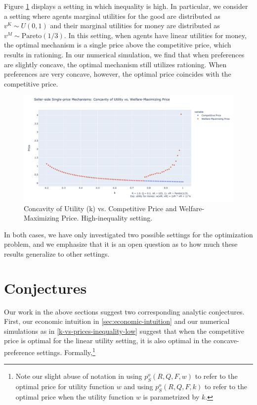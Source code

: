 \documentclass[AER]{AEA}
\begin{document}
Figure \ref{k-vs-prices-inequality-high} displays a setting in which inequality is high. In particular, we consider a setting where agents marginal utilities for the good are distributed as $v^K \sim U(0,1)$ and their marginal utilities for money are distributed as $v^M \sim \textrm{Pareto}(1/3)$. In this setting, when agents have linear utilities for money, the optimal mechanism is a single price above the competitive price, which results in rationing. In our numerical simulation, we find that when preferences are slightly concave, the optimal mechanism still utilizes rationing. When preferences are very concave, however, the optimal price coincides with the competitive price.

\begin{figure}
    \label{k-vs-prices-inequality-high}
    \includegraphics[width=\textwidth]{figures/k-vs-prices-inequality-high.png}
    \caption{Concavity of Utility (k) vs. Competitive Price and Welfare-Maximizing Price. High-inequality setting.}
\end{figure}

In both cases, we have only investigated two possible settings for the optimization problem, and we emphasize that it is an open question as to how much these results generalize to other settings.

\section{Conjectures}
\label{sec:conjectures}

Our work in the above sections suggest two corresponding analytic conjectures. First, our economic intuition in \ref{sec:economic-intuition} and our numerical simulations as in \ref{k-vs-prices-inequality-low} suggest that when the competitive price is optimal for the linear utility setting, it is also optimal in the concave-preference settings. Formally,\footnote{Note our slight abuse of notation in using $p_S^o(R, Q, F, w)$ to refer to the optimal price for utility function $w$ and using $p_S^o(R, Q, F, k)$ to refer to the optimal price when the utility function $w$ is parametrized by $k$.}
\end{document}
